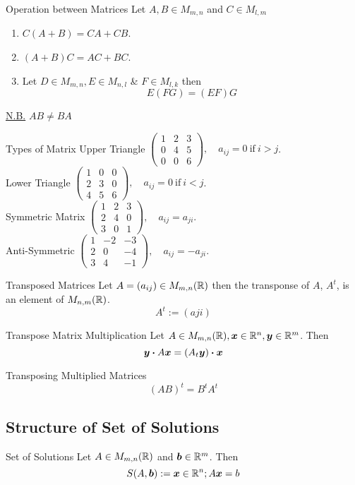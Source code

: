 \documentclass[11pt,a4paper]{article}
\begin{document}
\subtitle{Theorem 3.09 - }{Operation between Matrices}
Let $A, B \in M_{m,n}$ and $C \in M_{l,m}$
\begin{enumerate}[label=\roman*)]
  \item $C(A + B) = CA + CB$.
  \item $(A + B)C = AC + BC$.
  \item Let $D \in M_{m,n}, E \in M_{n,l}$ \& $F \in M_{l, k}$ then $$E(FG) = (EF)G$$
\end{enumerate}
\underline{N.B.} $AB \not = BA$ \\

\subtitle{Definition 3.10 - }{Types of Matrix}
Upper Triangle $\begin{pmatrix}
1 & 2 & 3 \\
0 & 4 & 5 \\
0 & 0 & 6
\end{pmatrix},\quad a_{ij} = 0 \mathrm{\ if\ } i > j$. \\
Lower Triangle $\begin{pmatrix}
1 & 0 & 0 \\
2 & 3 & 0 \\
4 & 5 & 6
\end{pmatrix},\quad a_{ij} = 0 \mathrm{\ if\ } i < j$. \\
Symmetric Matrix $\begin{pmatrix}
1 & 2 & 3 \\
2 & 4 & 0 \\
3 & 0 & 1
\end{pmatrix},\quad a_{ij} = a_{ji}.$ \\
Anti-Symmetric $\begin{pmatrix}
1 & -2 & -3 \\
2 & 0 & -4 \\
3 & 4 & -1
\end{pmatrix},\quad a_{ij} = -a_{ji}$. \\

\subtitle{Definition 3.11 - }{Transposed Matrices}
Let $A = (a_{ij}) \in M_{m,n}(\mathbb{R})$ then the transponse of $A$, $A^t$, is an element of $M_{n,m}(\mathbb{R})$. $$A^t := (aji)$$

\subtitle{Theorem 3.12 - }{Transpose Matrix Multiplication}
Let $A \in M_{m,n}(\mathbb{R}), \boldsymbol{x} \in \mathbb{R}^n, \boldsymbol{y} \in \mathbb{R}^m$. Then
$$\boldsymbol{y} \boldsymbol{\cdot} A \boldsymbol{x} = \left(A_t \boldsymbol{y}\right) \boldsymbol{\cdot} \boldsymbol{x}$$

\subtitle{Theorem 3.10 - }{Transposing Multiplied Matrices}
$$(AB)^t = B^t A^t$$

\subsection{Structure of Set of Solutions}
%
\subtitle{Definition 3.13 - }{Set of Solutions}
Let $A \in M_{m,n}(\mathbb{R})$ and $\boldsymbol{b} \in \mathbb{R}^m$. Then $$S(A, \boldsymbol{b}) :={\boldsymbol{x} \in \mathbb{R}^n; A\boldsymbol{x} = b}$$
\end{document}
